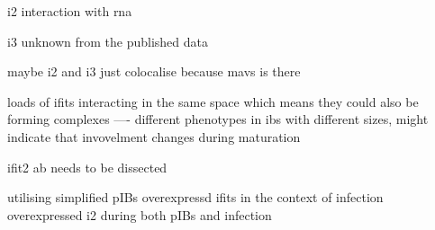i2 interaction with rna \cite{Yang2012CrystalMechanisms}

i3 unknown from the published data

maybe i2 and i3 just colocalise because mavs is there \cite{Chen2017InhibitionApoptosis, Diamond2013TheProteins} \cite{Liu2011IFN-InducedTBK1}

loads of ifits interacting in the same space which means they could also be forming complexes
\cite{Mears2018BetterResponse} 
----
different phenotypes in ibs with different sizes, might indicate that invovelment changes during maturation

ifit2 ab needs to be dissected

utilising simplified pIBs
overexpressd ifits in the context of infection
overexpressed i2 during both pIBs and infection


